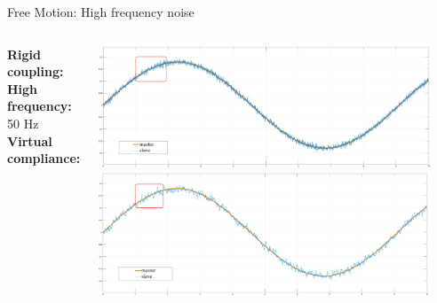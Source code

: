 \documentclass[10pt]{beamer}
\begin{document}
\begin{frame}{Free Motion: High frequency noise}
\smallskip
\begin{columns}
	\color{Orange}\textbf{Rigid coupling:}\\
	\bigskip
	\bigskip
	\bigskip
	\color{black}\textbf{High frequency:} 50 Hz\\
	\bigskip
	\bigskip
	\bigskip
	\color{LightBlue}\textbf{Virtual compliance:}\\
	
	
	\includegraphics[width=\textwidth,
	height=0.45\textwidth]{../reportTeleop/Images/rCoupFreeTot50htznoiseRect}\\
	\smallskip
	\includegraphics[width=\textwidth,
	height=0.45\textwidth]{../reportTeleop/Images/set20freeTot50HtznoiseRect}
\end{columns}

\end{frame}
\end{document}
